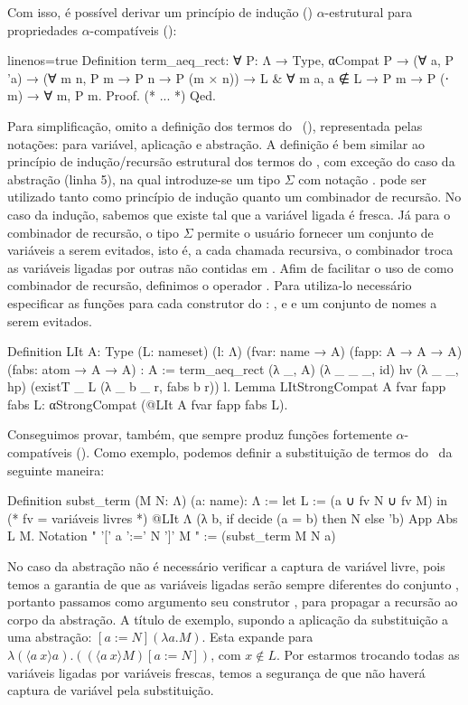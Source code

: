 Com isso, é possível derivar um princípio de indução () $\alpha$-estrutural para propriedades $\alpha$-compatíveis ():
\begin{coqcode*}{linenos=true}
Definition term_aeq_rect:
  ∀ P: Λ → Type, αCompat P →
    (∀ a, P 'a) →
    (∀ m n, P m → P n → P (m × n)) →
    {L & ∀ m a, a ∉ L → P m → P (\a ⋅ m)} →
    ∀ m, P m.
Proof. (* ... *) Qed.
\end{coqcode*}
Para simplificação, omito a definição dos termos do \lcalc~(), representada pelas notações:  para variável,  aplicação e  abstração. A definição  é bem similar ao princípio de indução/recursão estrutural dos termos do \lcalc, com exceção do caso da abstração (linha 5), na qual introduze-se um tipo $\Sigma$ com notação .  pode ser utilizado tanto como princípio de indução quanto um combinador de recursão. No caso da indução, sabemos que existe  tal que a variável ligada é fresca. Já para o combinador de recursão, o tipo $\Sigma$ permite o usuário fornecer um conjunto de variáveis a serem evitados, isto é, a cada chamada recursiva, o combinador troca as variáveis ligadas por outras não contidas em . Afim de facilitar o uso de  como combinador de recursão, definimos o operador . Para utiliza-lo  necessário especificar as funções para cada construtor do \lcalc: ,  e  e um conjunto  de nomes a serem evitados.
\begin{coqcode}
Definition LIt {A: Type} (L: nameset) (l: Λ)
           (fvar: name → A) (fapp: A → A → A) (fabs: atom → A → A) : A :=
  term_aeq_rect (λ _, A) (λ _ _ _, id) hv (λ _ _, hp)
                (existT _ L (λ _ b _ r, fabs b r)) l.
Lemma LItStrongCompat {A} fvar fapp fabs L:
  αStrongCompat (@LIt A fvar fapp fabs L).
\end{coqcode}
Conseguimos provar, também, que  sempre produz funções fortemente $\alpha$-compatíveis (). Como exemplo, podemos definir a substituição de termos do \lcalc~da seguinte maneira:
\begin{coqcode}
Definition subst_term (M N: Λ) (a: name): Λ :=
  let L := ({a} ∪ fv N ∪ fv M) in (* fv = variáveis livres *)
  @LIt Λ (λ b, if decide (a = b) then N else 'b) App Abs L M.
Notation " '[' a ':=' N ']' M " := (subst_term M N a)
\end{coqcode}
No caso da abstração não é necessário verificar a captura de variável livre, pois temos a garantia de que as variáveis ligadas serão sempre diferentes do conjunto , portanto passamos como argumento seu construtor , para propagar a recursão ao corpo da abstração. A título de exemplo, supondo a aplicação da substituição a uma abstração: $[a := N](\lambda a . M)$. Esta expande para $\lambda (\langle a~x \rangle a) . ((\langle a~x \rangle M)[a := N])$, com $x \notin L$. Por estarmos trocando todas as variáveis ligadas por variáveis frescas, temos a segurança de que não haverá captura de variável pela substituição. 

